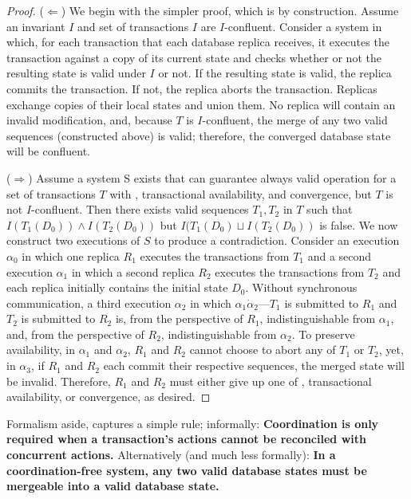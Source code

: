 \begin{proof}
($\Leftarrow$) We begin with the simpler proof, which is by
  construction. Assume an invariant $I$ and set of transactions $I$
  are $I$-confluent. Consider a system in which, for each transaction
  that each database replica receives, it executes the transaction
  against a copy of its current state and checks whether or not the
  resulting state is valid under $I$ or not. If the resulting state is
  valid, the replica commits the transaction. If not, the replica
  aborts the transaction. Replicas exchange copies of their local
  states and union them. No replica will contain an invalid
  modification, and, because $T$ is $I$-confluent, the merge of any
  two valid sequences (constructed above) is valid; therefore, the
  converged database state will be confluent.

($\Rightarrow$) Assume a system S exists that can guarantee always
  valid operation for a set of transactions $T$ with \cfreedom,
  transactional availability, and convergence, but $T$ is not
  $I$-confluent. Then there exists valid sequences $T_1,T_2$ in $T$
  such that $I(T_1(D_0)) \wedge I(T_2(D_0))$ but $I(T_1(D_0) \sqcup
  I(T_2(D_0))$ is false. We now construct two executions of $S$ to
  produce a contradiction. Consider an execution $\alpha_0$ in which
  one replica $R_1$ executes the transactions from $T_1$ and a second
  execution $\alpha_1$ in which a second replica $R_2$ executes the
  transactions from $T_2$ and each replica initially contains the
  initial state $D_0$. Without synchronous communication, a third
  execution $\alpha_2$ in which $\alpha_1 \dot \alpha_2$---$T_1$ is
  submitted to $R_1$ and $T_2$ is submitted to $R_2$ is, from the
  perspective of $R_1$, indistinguishable from $\alpha_1$, and, from
  the perspective of $R_2$, indistinguishable from $\alpha_2$. To
  preserve availability, in $\alpha_1$ and $\alpha_2$, $R_1$ and $R_2$
  cannot choose to abort any of $T_1$ or $T_2$, yet, in $\alpha_3$, if
  $R_1$ and $R_2$ each commit their respective sequences, the merged
  state will be invalid. Therefore, $R_1$ and $R_2$ must either give
  up one of \cfreedom, transactional availability, or convergence, as
  desired.
\end{proof}

Formalism aside, \iconfluence captures a simple rule; informally:
\textbf{Coordination is only required when a transaction's actions
  cannot be reconciled with concurrent actions.}  Alternatively (and
much less formally): \textbf{In a coordination-free system, any two
  valid database states must be mergeable into a valid database
  state.}

